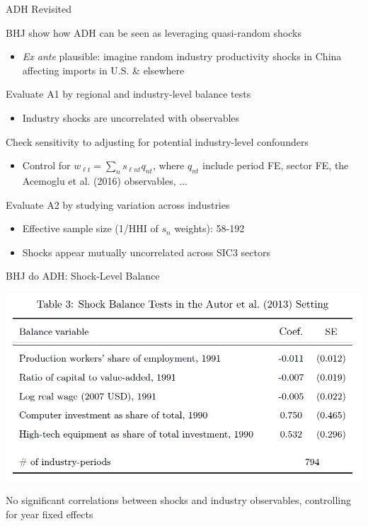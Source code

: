 \documentclass{beamer}
\begin{document}
\begin{frame}{ADH Revisited}
\vspace{-0.3cm}

 BHJ show how ADH can be seen as leveraging quasi-random shocks\smallskip
	\begin{itemize}
	\item \emph{Ex ante} plausible: imagine random industry productivity shocks in China affecting imports in U.S. \& elsewhere
	\end{itemize}
\medskip\pause{}

 Evaluate A1 by regional and industry-level balance tests\smallskip
	\begin{itemize}
	\item Industry shocks are uncorrelated with observables
	\end{itemize}
\medskip\pause{}

 Check sensitivity to adjusting for potential industry-level confounders\smallskip
	\begin{itemize}
	\item Control for $w_{\ell t}=\sum_n s_{\ell nt} q_{nt}$, where $q_{nt}$ include period FE, sector FE, the Acemoglu et al. (2016) observables, ...
	\end{itemize}
\medskip\pause{}

 Evaluate A2 by studying variation across industries\smallskip
	\begin{itemize}
	\item Effective sample size (1/HHI of $s_n$ weights): 58-192\smallskip
	\item Shocks appear mutually uncorrelated across SIC3 sectors
	\end{itemize}
\end{frame} 

\begin{frame}{BHJ do ADH: Shock-Level Balance}
\begin{center}
\includegraphics[scale=0.6]{lecture_includes/adh_balance.png}
\end{center}

No significant correlations between shocks and industry observables, controlling for year fixed effects
\end{frame}
\end{document}
